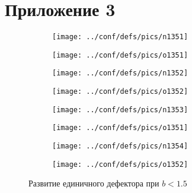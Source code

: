 \documentclass[12pt,a4paper]{article}
\begin{document}
 	\section{Приложение 3}	
 	\begin{figure}[H]
	
	\begin{subfigure}{.5\textwidth}
		\caption{}
		\label{fig:n1351}
		\texttt{[image: ../conf/defs/pics/n1351]}
	\end{subfigure}%
	\begin{subfigure}{.5\textwidth}
		\caption{}
		\label{fig:o1351}
		\texttt{[image: ../conf/defs/pics/o1351]}
	\end{subfigure}%

	\begin{subfigure}{.5\textwidth}
		\caption{}
		\label{fig:n1351}
		\texttt{[image: ../conf/defs/pics/n1352]}
	\end{subfigure}%
	\begin{subfigure}{.5\textwidth}
		\caption{}
		\label{fig:n1351}
		\texttt{[image: ../conf/defs/pics/o1352]}
	\end{subfigure}%

	\begin{subfigure}{.5\textwidth}
		\caption{}
		\label{fig:n1351}
		\texttt{[image: ../conf/defs/pics/n1353]}
	\end{subfigure}%
	\begin{subfigure}{.5\textwidth}
		\caption{}
		\label{fig:n1351}
		\texttt{[image: ../conf/defs/pics/o1351]}
	\end{subfigure}%

	\begin{subfigure}{.5\textwidth}
		\caption{}
		\label{fig:n1351}
		\texttt{[image: ../conf/defs/pics/n1354]}
	\end{subfigure}%
	\begin{subfigure}{.5\textwidth}
		\caption{}
		\label{fig:n1351}
		\texttt{[image: ../conf/defs/pics/o1352]}
	\end{subfigure}%
	\caption{Развитие единичного дефектора при $b<1.5$}
	\end{figure}
\end{document}
